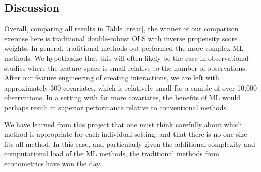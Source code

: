 \documentclass[paper=letter, fontsize=11pt]{scrartcl} %
\begin{document}
\subsection{Discussion}

Overall, comparing all results in Table \ref{treat}, the winner of our comparison exercise here is traditional double-robust OLS with inverse propensity score weights. In general, traditional methods out-performed the more complex ML methods. We hypothesize that this will often likely be the case in observational studies where the feature space is small relative to the number of observations. After our feature engineering of creating interactions, we are left with approximately 300 covariates, which is relatively small for a sample of over 10,000 observations. In a setting with far more covariates, the benefits of ML would perhaps result in superior performance relative to conventional methods.

We have learned from this project that one must think carefully about which method is appropriate for each individual setting, and that there is no one-size-fits-all method. In this case, and particularly given the additional complexity and computational load of the ML methods, the traditional methods from econometrics have won the day.
\end{document}
